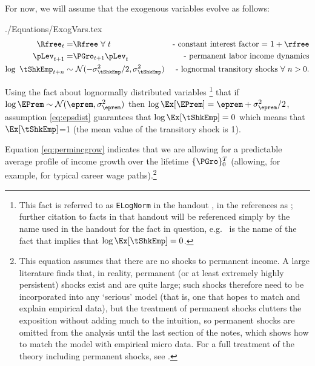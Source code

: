 \documentclass[titlepage]{\econtex}
\begin{document}


For now, we will assume that the exogenous variables evolve as follows: 
\begin{verbatimwrite}{./Equations/ExogVars.tex}
  \begin{eqnarray}
    \Rfree_{t}   = & \Rfree~\forall~t & \text{- constant interest factor = $1+\rfree$}  \notag
    \\ \pLev_{t+1}  = & \PGro_{t+1}\pLev_{t} &   \text{- permanent labor income dynamics} \label{eq:permincgrow} 
    \\ \log ~ \tShkEmp_{t+n} \sim &  ~\mathcal{N}(-\sigma_{\tShkEmp}^{2}/2,\sigma_{\tShkEmp}^{2}) & \text{- lognormal transitory shocks}~\forall~n>0 \notag
                                                                                                    \label{eq:epsdist}
                                                                                                    .
  \end{eqnarray}
\end{verbatimwrite}


Using the fact about lognormally distributed variables \footnote{This fact is referred to as \texttt{ELogNorm}
  in the handout , in the references as \cite{MathFacts};
  further citation to facts in that handout will be referenced simply by
  the name used in the handout for the fact in question, e.g.\
   is the name of the fact that implies that $\log \Ex[{\tShkEmp}]=0$.} that if $\log \EPrem \sim
\mathcal{N}(\eprem,\sigma_{\eprem}^{2})$ then $\log \Ex[{\EPrem}] =
\eprem +\sigma_{\eprem}^{2}/2$, assumption \eqref{eq:epsdist} guarantees that $\log \Ex[{\tShkEmp}] = 0$ which means that
$\Ex[{\tShkEmp}]$=1 (the mean value of the transitory shock is 1).

Equation \eqref{eq:permincgrow} indicates that we are allowing
for a predictable average profile of income growth over the lifetime $\{\PGro\}_{0}^{T}$ 
(allowing, for example, for typical career wage
paths).\footnote{This equation assumes that there are no shocks to
  permanent income.  A large literature finds that, in reality,
  permanent (or at least extremely highly persistent) shocks exist and are quite large; such shocks therefore
  need to be incorporated into any `serious' model (that is, one that
  hopes to match and explain empirical data), but the treatment of
  permanent shocks clutters the exposition without adding much to the
  intuition, so permanent shocks are omitted from the analysis
  until the last section of the notes, which shows how to match the
  model with empirical micro data.  For a full treatment of the
  theory including permanent shocks, see \cite{BufferStockTheory}.}
\end{document}
